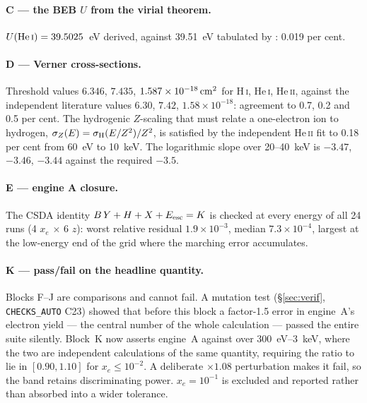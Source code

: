 \documentclass[11pt,a4paper]{article}
\begin{document}
\paragraph{C --- the BEB $U$ from the virial theorem.}
$U({\rm He\,\textsc{i}}) = 39.5025$~eV derived, against 39.51~eV tabulated by
\citet{KimRudd1994}: 0.019 per cent.

\paragraph{D --- Verner cross-sections.}
Threshold values $6.346$, $7.435$, $1.587\times10^{-18}\,{\rm cm^2}$ for
H\,\textsc{i}, He\,\textsc{i}, He\,\textsc{ii}, against the independent
literature values $6.30$, $7.42$, $1.58\times10^{-18}$: agreement to 0.7, 0.2
and 0.5 per cent.  The hydrogenic $Z$-scaling that must relate a one-electron
ion to hydrogen, $\sigma_Z(E) = \sigma_{\rm H}(E/Z^2)/Z^2$, is satisfied by
the independent He\,\textsc{ii} fit to 0.18 per cent from 60~eV to 10~keV.
The logarithmic slope over 20--40~keV is $-3.47$, $-3.46$, $-3.44$ against the
required $-3.5$.

\paragraph{E --- engine A closure.}
The CSDA identity $B\,Y + H + X + E_{\rm esc} = K$ is checked at every energy
of all 24 runs (4 $x_e$ $\times$ 6 $z$): worst relative residual
$1.9\times10^{-3}$, median $7.3\times10^{-4}$, largest at the low-energy end
of the grid where the marching error accumulates.

\paragraph{K --- pass/fail on the headline quantity.}
Blocks F--J are comparisons and cannot fail.  A mutation test
(\S\ref{sec:verif}, \texttt{CHECKS\_AUTO} C23) showed that before this block a
factor-1.5 error in engine~A's electron yield --- the central number of the
whole calculation --- passed the entire suite silently.  Block~K now asserts
engine~A against \citet{ShullVanSteenberg1985} over 300~eV--3~keV, where the
two are independent calculations of the same quantity, requiring the ratio to
lie in $[0.90,1.10]$ for $x_e\le10^{-2}$.  A deliberate $\times1.08$
perturbation makes it fail, so the band retains discriminating power.
$x_e=10^{-1}$ is excluded and reported rather than absorbed into a wider
tolerance.
\end{document}
